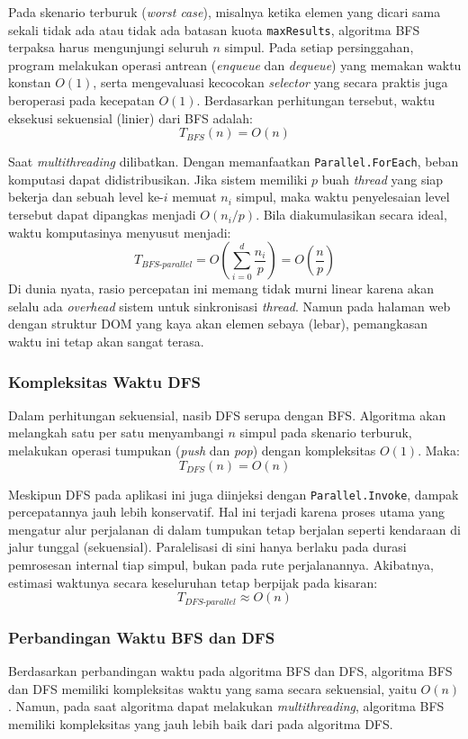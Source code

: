 \documentclass[12pt]{article}
\begin{document}
Pada skenario terburuk (\textit{worst case}), misalnya ketika elemen yang dicari sama sekali tidak ada atau tidak ada batasan kuota \texttt{maxResults}, algoritma BFS terpaksa harus mengunjungi seluruh $n$ simpul. Pada setiap persinggahan, program melakukan operasi antrean (\textit{enqueue} dan \textit{dequeue}) yang memakan waktu konstan $O(1)$, serta mengevaluasi kecocokan \textit{selector} yang secara praktis juga beroperasi pada kecepatan $O(1)$. Berdasarkan perhitungan tersebut, waktu eksekusi sekuensial (linier) dari BFS adalah:
\[
T_{BFS}(n) = O(n)
\]

Saat \textit{multithreading} dilibatkan. Dengan memanfaatkan \texttt{Parallel.ForEach}, beban komputasi dapat didistribusikan. Jika sistem memiliki $p$ buah \textit{thread} yang siap bekerja dan sebuah level ke-$i$ memuat $n_i$ simpul, maka waktu penyelesaian level tersebut dapat dipangkas menjadi $O(n_i / p)$. Bila diakumulasikan secara ideal, waktu komputasinya menyusut menjadi:
\[
T_{BFS\text{-}parallel} = O\!\left(\sum_{i=0}^{d} \frac{n_i}{p}\right) = O\!\left(\frac{n}{p}\right)
\]
Di dunia nyata, rasio percepatan ini memang tidak murni linear karena akan selalu ada \textit{overhead} sistem untuk sinkronisasi \textit{thread}. Namun pada halaman web dengan struktur DOM yang kaya akan elemen sebaya (lebar), pemangkasan waktu ini tetap akan sangat terasa.

\subsubsection{Kompleksitas Waktu DFS}

Dalam perhitungan sekuensial, nasib DFS serupa dengan BFS. Algoritma akan melangkah satu per satu menyambangi $n$ simpul pada skenario terburuk, melakukan operasi tumpukan (\textit{push} dan \textit{pop}) dengan kompleksitas $O(1)$. Maka:
\[
T_{DFS}(n) = O(n)
\]

Meskipun DFS pada aplikasi ini juga diinjeksi dengan \texttt{Parallel.Invoke}, dampak percepatannya jauh lebih konservatif. Hal ini terjadi karena proses utama yang mengatur alur perjalanan di dalam tumpukan tetap berjalan seperti kendaraan di jalur tunggal (sekuensial). Paralelisasi di sini hanya berlaku pada durasi pemrosesan internal tiap simpul, bukan pada rute perjalanannya. Akibatnya, estimasi waktunya secara keseluruhan tetap berpijak pada kisaran:
\[
T_{DFS\text{-}parallel} \approx O(n)
\]

\subsubsection{Perbandingan Waktu BFS dan DFS}
Berdasarkan perbandingan waktu pada algoritma BFS dan DFS, algoritma BFS dan DFS memiliki kompleksitas waktu yang sama secara sekuensial, yaitu  $O(n)$. Namun, pada saat algoritma dapat melakukan \textit{multithreading}, algoritma BFS memiliki kompleksitas yang jauh lebih baik dari pada algoritma DFS.
\end{document}
